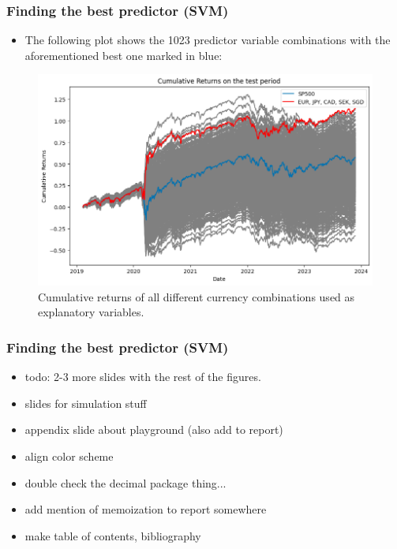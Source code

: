 \documentclass{beamer}
\begin{document}
\begin{frame}
\frametitle{Finding the best predictor (SVM)}
\begin{itemize}
    \item The following plot shows the 1023 predictor variable combinations with the aforementioned best one marked in blue:
\end{itemize}
\begin{figure}[h!]
\begin{center}
  \includegraphics[width=0.6\columnwidth]{images/best_predictor.png}
  \caption{Cumulative returns of all different currency combinations used as explanatory variables.}
\end{center}
  \label{fig: cumulative returns}
\end{figure}
\end{frame}

\begin{frame}
\frametitle{Finding the best predictor (SVM)}
 \begin{itemize}
     \item todo: 2-3 more slides with the rest of the figures.
     \item slides for simulation stuff
     \item appendix slide about playground (also add to report)
     \item align color scheme
     \item double check the decimal package thing...
     \item add mention of memoization to report somewhere
     \item make table of contents, bibliography
 \end{itemize}
\end{frame}

\
    
\end{document}

